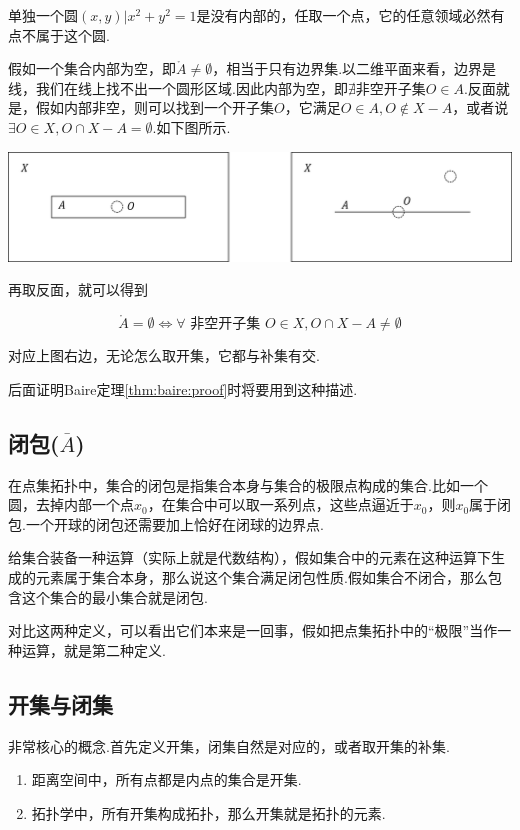 单独一个圆${(x,y)|x^2+y^2=1}$是没有内部的，任取一个点，它的任意领域必然有点不属于这个圆.

假如一个集合内部为空，即$\mathring{A} \neq \emptyset$，相当于只有边界集.以二维平面来看，边界是线，我们在线上找不出一个圆形区域.因此内部为空，即$\nexists \text{非空开子集} O\in A$.反面就是，假如内部非空，则可以找到一个开子集$O$，它满足$O\in A, O\notin X-A$，或者说$\exists O\in X, O\cap X-A=\emptyset$.如下图所示.

\begin{center}
	\includegraphics[width=\linewidth]{figure/集合内部非空.png}
\end{center}

再取反面，就可以得到

$$\mathring{A}=\emptyset \iff \forall \text{ 非空开子集 } O \in X, O\cap X-A\neq \emptyset $$

对应上图右边，无论怎么取开集，它都与补集有交.

后面证明Baire定理\ref{thm:baire:proof}时将要用到这种描述.

\subsection{闭包($\overline{A}$)}
在点集拓扑中，集合的闭包是指集合本身与集合的极限点构成的集合.比如一个圆，去掉内部一个点$x_0$，在集合中可以取一系列点，这些点逼近于$x_0$，则$x_0$属于闭包.一个开球的闭包还需要加上恰好在闭球的边界点.

给集合装备一种运算（实际上就是代数结构），假如集合中的元素在这种运算下生成的元素属于集合本身，那么说这个集合满足闭包性质.假如集合不闭合，那么包含这个集合的最小集合就是闭包.

对比这两种定义，可以看出它们本来是一回事，假如把点集拓扑中的“极限”当作一种运算，就是第二种定义.

\subsection{开集与闭集}
非常核心的概念.首先定义开集，闭集自然是对应的，或者取开集的补集.

\begin{enumerate}
	\item 距离空间中，所有点都是内点的集合是开集.
	\item 拓扑学中，所有开集构成拓扑，那么开集就是拓扑的元素.
\end{enumerate}

